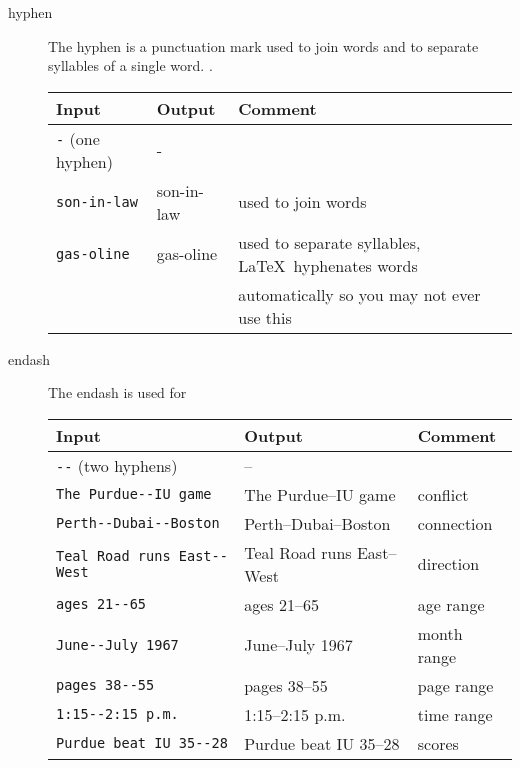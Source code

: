 \begin{description}

  \item[hyphen]
    The hyphen
    is a punctuation mark used to join words
    and to separate syllables of a single word.
    \cite{wikipedia-hyphen}.
    
    \begin{singlespace}
      \begin{tabular}{@{}lll@{}}
        \toprule
        \bfseries Input& \bfseries Output& \bfseries Comment\\
        \midrule
        \verb+-+ (one hyphen)& -\\
        \verb+son-in-law+& son-in-law& used to join words\\
        \verb+gas-oline+& gas-oline& used to separate syllables, \LaTeX\ hyphenates words\\
        & & automatically so you may not ever use this\\
        \bottomrule
      \end{tabular}
    \end{singlespace}

  \item[endash]
    The endash
    \cite{wikipedia-endash}
     is used for
    \begin{singlespace}
      \begin{tabular}{@{}lll@{}}
        \toprule
        \bfseries Input& \bfseries Output& \bfseries Comment\\
        \midrule
        \verb+--+ (two hyphens)& --\\
        \verb+The Purdue--IU game+& The Purdue--IU game& conflict\\
        \verb+Perth--Dubai--Boston+& Perth--Dubai--Boston& connection\\
        \verb+Teal Road runs East--West+& Teal Road runs East--West& direction\\
        \verb+ages 21--65+& ages 21--65& age range\\
        \verb+June--July 1967+& June--July 1967& month range\\
        \verb+pages 38--55+& pages 38--55& page range\\
        \verb+1:15--2:15 p.m.+& 1:15--2:15 p.m.& time range\\
        \verb+Purdue beat IU 35--28+& Purdue beat IU 35--28& scores\\
        \bottomrule
      \end{tabular}
    \end{singlespace}


\end{description}
